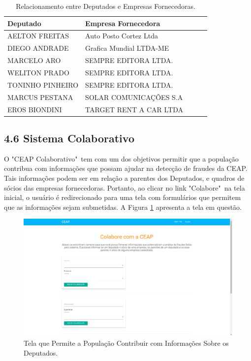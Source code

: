 \documentclass[12pt]{article}
\begin{document}
\begin{table}[h!]
\centering
\caption{Relacionamento entre Deputados e Empresas Fornecedoras.}
\begin{tabular}{|l|l|l|l|l|}
\hline
Deputado & Empresa Fornecedora \\ \hline
AELTON FREITAS & Auto Posto Cortez Ltda \\ \hline
DIEGO ANDRADE & Grafica Mundial LTDA-ME \\ \hline
MARCELO ARO & SEMPRE EDITORA LTDA. \\ \hline
WELITON PRADO & SEMPRE EDITORA LTDA. \\ \hline
TONINHO PINHEIRO & SEMPRE EDITORA LTDA. \\ \hline
MARCUS PESTANA & SOLAR COMUNICAÇÕES S.A \\ \hline
EROS BIONDINI & TARGET RENT A CAR LTDA \\ \hline
\end{tabular}
\label{table:relation_deputies_companies}
\end{table}

\subsection{4.6 Sistema Colaborativo} \label{sec:colab info}

O "CEAP Colaborativo"\ tem com um dos objetivos permitir que a população contribua com informações que possam ajudar na detecção de fraudes da CEAP. Tais informações podem ser em relação a parentes dos Deputados, e quadros de sócios das empresas fornecedoras. Portanto, ao clicar no link "Colabore"\ na tela inicial, o usuário é redirecionado para uma tela com formulários que permitem que as informações sejam submetidas. A Figura \ref{fig:collaborate} apresenta a tela em questão.

\begin{figure}[ht]
\centering
\includegraphics[width=.7\textwidth]{collaborate.png}
\caption{Tela que Permite a População Contribuir com Informações Sobre os Deputados.}
\label{fig:collaborate}
\end{figure}
\end{document}

